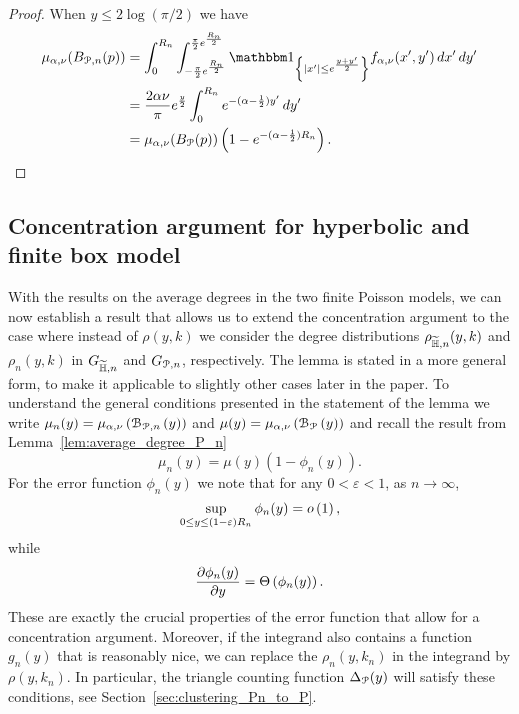 \begin{proof}
When $y \le 2 \log(\pi/2)$ we have
\begin{align*}
	\mu_{\alpha,\nu}(B_{\Pcal,n}(p))
	&= \int_0^{R_n} \int_{-\frac{\pi}{2}e^{\frac{R_n}{2}}}^{\frac{\pi}{2}e^{\frac{R_n}{2}}} 
		\ind{|x^\prime| \le e^{\frac{y+y^\prime}{2}}} f_{\alpha,\nu}(x^\prime,y^\prime) \, dx^\prime \, dy^\prime\\
	&= \frac{2 \alpha \nu}{\pi} e^{\frac{y}{2}} \int_0^{R_n} e^{-(\alpha - \frac{1}{2})y^\prime} \, dy^\prime\\
	&= \mu_{\alpha,\nu}(B_\Pcal(p))\left(1 - e^{-(\alpha - \frac{1}{2})R_n}\right).
\end{align*}
\end{proof}

\subsection{Concentration argument for hyperbolic and finite box model}

With the results on the average degrees in the two finite Poisson models, we can now establish a result that allows us to extend the concentration argument to the case where instead of $\rho(y,k)$ we consider the degree distributions $\rho_{\widetilde{\mathbb{H}},n}(y,k)$ and $\rho_{n}(y,k)$ in $G_{\widetilde{\mathbb{H}},n}$ and $G_{{\mathcal P},n}$, respectively. The lemma is stated in a more general form, to make it applicable to slightly other cases later in the paper. To understand the general conditions presented in the statement of the lemma we write $\mu_n(y) = \mu_{\alpha,\nu}\left({\mathcal B}_{{\mathcal P},n}\left(y\right)\right)$ and $\mu(y) = \mu_{\alpha,\nu}\left({\mathcal B}_{{\mathcal P}}\left(y\right)\right)$ and recall the result from Lemma~\ref{lem:average_degree_P_n}
\[
	\mu_n(y) = \mu(y)(1 - \phi_n(y)).
\]
For the error function $\phi_n(y)$ we note that for any $0 < \varepsilon < 1$, as $n \to \infty$, 
\[
	\sup_{0 \le y \le (1-\varepsilon)R_n} \phi_n(y) = o\left(1\right),
\]
while
\[
	\frac{\partial \phi_n(y)}{\partial y} = \Theta\left(\phi_n(y)\right).
\]
These are exactly the crucial properties of the error function that allow for a concentration argument. Moreover, if the integrand also contains a function $g_n(y)$ that is reasonably nice, we can replace the $\rho_{n}(y,k_n)$ in the integrand by $\rho(y,k_n)$. In particular, the triangle counting function $\Delta_{{\mathcal P}}(y)$ will satisfy these conditions, see Section~\ref{sec:clustering_Pn_to_P}.

